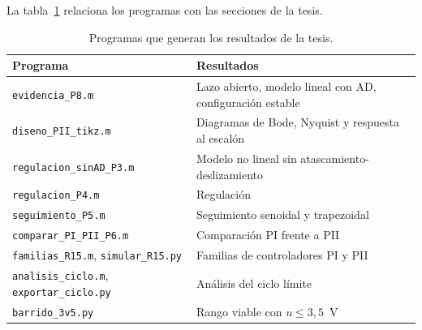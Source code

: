 La tabla~\ref{tab:scripts} relaciona los programas con las secciones de la tesis.

\begin{table}[ht]
\centering
\caption{Programas que generan los resultados de la tesis.}
\label{tab:scripts}
\small
\begin{tabular}{|l|p{}|}
\hline
Programa & Resultados \\ \hline
\texttt{evidencia\_P8.m} & Lazo abierto, modelo lineal con AD, configuración estable \\ \hline
\texttt{diseno\_PII\_tikz.m} & Diagramas de Bode, Nyquist y respuesta al escalón \\ \hline
\texttt{regulacion\_sinAD\_P3.m} & Modelo no lineal sin atascamiento-deslizamiento \\ \hline
\texttt{regulacion\_P4.m} & Regulación \\ \hline
\texttt{seguimiento\_P5.m} & Seguimiento senoidal y trapezoidal \\ \hline
\texttt{comparar\_PI\_PII\_P6.m} & Comparación PI frente a PII \\ \hline
\texttt{familias\_R15.m}, \texttt{simular\_R15.py} & Familias de controladores PI y PII \\ \hline
\texttt{analisis\_ciclo.m}, \texttt{exportar\_ciclo.py} & Análisis del ciclo límite \\ \hline
\texttt{barrido\_3v5.py} & Rango viable con $u\le3{,}5$~V \\ \hline
\end{tabular}
\end{table}
